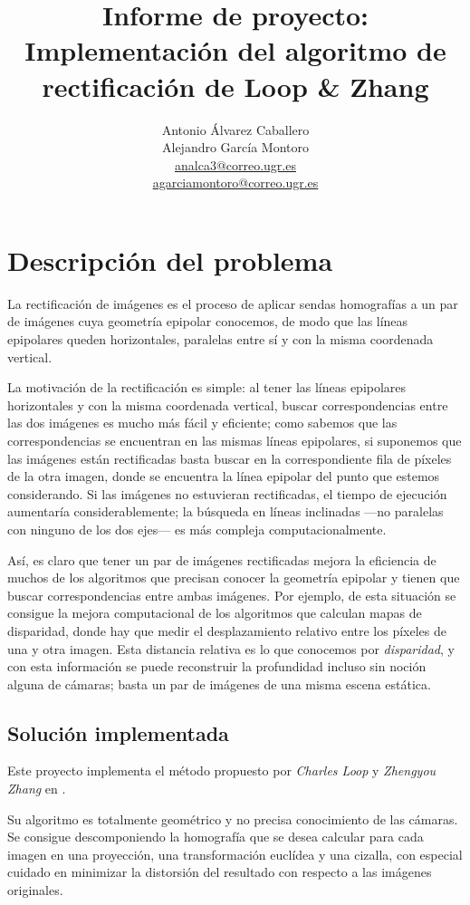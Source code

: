 \documentclass[a4paper, 11pt]{article}
\title{Informe de proyecto: \\ Implementación del algoritmo de rectificación de Loop \& Zhang}
\author{Antonio Álvarez Caballero \\ Alejandro García Montoro \\
    \href{mailto:analca3@correo.ugr.es}{analca3@correo.ugr.es} \\
    \href{mailto:agarciamontoro@correo.ugr.es}{agarciamontoro@correo.ugr.es}}
\date{}
\theoremstyle{definition}
\begin{document}
  \maketitle

  \section{Descripción del problema}

    La rectificación de imágenes es el proceso de aplicar sendas homografías a un par de imágenes cuya geometría epipolar conocemos, de modo que las líneas epipolares queden horizontales, paralelas entre sí y con la misma coordenada vertical.

    La motivación de la rectificación es simple: al tener las líneas epipolares horizontales y con la misma coordenada vertical, buscar correspondencias entre las dos imágenes es mucho más fácil y eficiente; como sabemos que las correspondencias se encuentran en las mismas líneas epipolares, si suponemos que las imágenes están rectificadas basta buscar en la correspondiente fila de píxeles de la otra imagen, donde se encuentra la línea epipolar del punto que estemos considerando. Si las imágenes no estuvieran rectificadas, el tiempo de ejecución aumentaría considerablemente; la búsqueda en líneas inclinadas ---no paralelas con ninguno de los dos ejes--- es más compleja computacionalmente.

    Así, es claro que tener un par de imágenes rectificadas mejora la eficiencia de muchos de los algoritmos que precisan conocer la geometría epipolar y tienen que buscar correspondencias entre ambas imágenes. Por ejemplo, de esta situación se consigue la mejora computacional de los algoritmos que calculan mapas de disparidad, donde hay que medir el desplazamiento relativo entre los píxeles de una y otra imagen. Esta distancia relativa es lo que conocemos por \emph{disparidad}, y con esta información se puede reconstruir la profundidad incluso sin noción alguna de cámaras; basta un par de imágenes de una misma escena estática.

    \subsection{Solución implementada}

    Este proyecto implementa el método propuesto por \emph{Charles Loop} y \emph{Zhengyou Zhang} en \cite{LoopZhang}.

    Su algoritmo es totalmente geométrico y no precisa conocimiento de las cámaras.
    Se consigue descomponiendo la homografía que se desea calcular para cada imagen en una proyección, una transformación euclídea y una cizalla, con especial cuidado en minimizar la distorsión del resultado con respecto a las imágenes originales.
\end{document}
